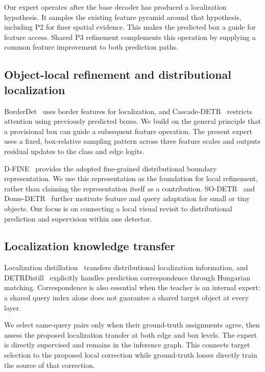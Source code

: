 Our expert operates after the base decoder has produced a localization hypothesis. It samples the existing feature pyramid around that hypothesis, including P2 for finer spatial evidence. This makes the predicted box a guide for feature access. Shared P3 refinement complements this operation by supplying a common feature improvement to both prediction paths.

\subsection{Object-local refinement and distributional localization}
BorderDet~\cite{qiu2020borderdet} uses border features for localization, and Cascade-DETR~\cite{ye2023cascadedetr} restricts attention using previously predicted boxes. We build on the general principle that a provisional box can guide a subsequent feature operation. The present expert uses a fixed, box-relative sampling pattern across three feature scales and outputs residual updates to the class and edge logits.

D-FINE~\cite{peng2025dfine} provides the adopted fine-grained distributional boundary representation. We use this representation as the foundation for local refinement, rather than claiming the representation itself as a contribution. SO-DETR~\cite{zhang2025sodetr} and Dome-DETR~\cite{hu2025domedetr} further motivate feature and query adaptation for small or tiny objects. Our focus is on connecting a local visual revisit to distributional prediction and supervision within one detector.

\subsection{Localization knowledge transfer}
Localization distillation~\cite{zheng2022ld} transfers distributional localization information, and DETRDistill~\cite{chang2023detrdistill} explicitly handles prediction correspondence through Hungarian matching. Correspondence is also essential when the teacher is an internal expert: a shared query index alone does not guarantee a shared target object at every layer.

We select same-query pairs only when their ground-truth assignments agree, then assess the proposed localization transfer at both edge and box levels. The expert is directly supervised and remains in the inference graph. This connects target selection to the proposed local correction while ground-truth losses directly train the source of that correction.

